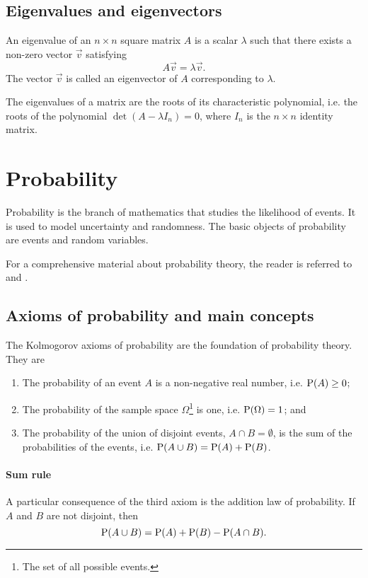 \subsection{Eigenvalues and eigenvectors}

An eigenvalue of an $n \times n$ square matrix $A$ is a scalar $\lambda$ such that there exists a
non-zero vector $\vec{v}$ satisfying
\begin{equation}
  \label{eq:eig}
  A \vec{v} = \lambda \vec{v}\text{.}
\end{equation}
The vector $\vec{v}$ is called an eigenvector of $A$ corresponding to $\lambda$.

The eigenvalues of a matrix are the roots of its characteristic polynomial, i.e. the
roots of the polynomial $\det(A - \lambda I_n) = 0$, where $I_n$ is the $n \times n$ identity matrix.

\section{Probability}

Probability is the branch of mathematics that studies the likelihood of events.  It is
used to model uncertainty and randomness.  The basic objects of probability are events
and random variables.

For a comprehensive material about probability theory, the reader is referred to
\textcite{Ross2019} and \textcite{Ross2023}.

\subsection{Axioms of probability and main concepts}

The Kolmogorov axioms of probability are the foundation of probability theory.
They are
\begin{enumerate}
  \item The probability of an event $A$ is a non-negative real number, i.e. $\operatorname{P}(A) \geq 0$;
  \item The probability of the sample space $\Omega$\footnote{The set of all possible
    events.} is one, i.e. $\operatorname{P}(\Omega) = 1$; and
  \item The probability of the union of disjoint events, $A \cap B = \emptyset$, is
    the sum of the probabilities of the events, i.e. $\operatorname{P}(A \cup B) = \operatorname{P}(A) + \operatorname{P}(B)$.
\end{enumerate}

\paragraph{Sum rule}
A particular consequence of the third axiom is the addition law of probability.
If $A$ and $B$ are not disjoint, then
\begin{equation*}
  \operatorname{P}(A \cup B) = \operatorname{P}(A) + \operatorname{P}(B) - \operatorname{P}(A \cap B)\text{.}
\end{equation*}

